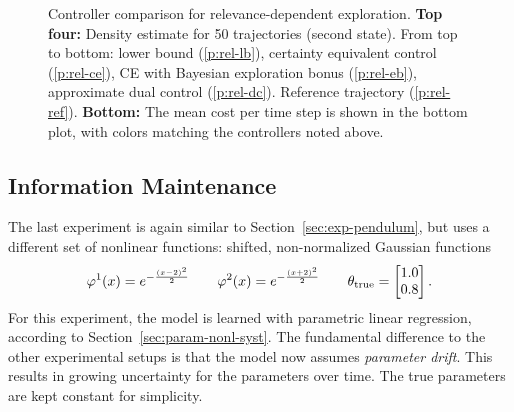 \begin{figure*}
  \setlength\figureheight{8cm}
  \setlength{}
  \footnotesize
  \caption[Controller comparison for relevance-dependent
exploration.]{Controller comparison for relevance-dependent exploration.
{\bfseries Top four:} Density estimate for 50 trajectories (second
state). From top to bottom: lower bound (\ref*{p:rel-lb}), certainty equivalent
control (\ref*{p:rel-ce}), CE with Bayesian exploration bonus (\ref*{p:rel-eb}),
approximate dual control (\ref*{p:rel-dc}). Reference trajectory
(\ref*{p:rel-ref}). {\bfseries Bottom:} The mean cost per time step is shown in
the bottom plot, with colors matching the controllers noted above.
  }\label{fig:position-relevance}
\end{figure*}

\subsection{Information Maintenance}
\label{sec:exp-knowledge-maintenance}
The last experiment is again similar to Section~\ref{sec:exp-pendulum}, but uses
a different set of nonlinear functions: shifted, non-normalized Gaussian
functions
\begin{equation}
  \varphi^1(x) = e^{-\frac{(x-2)^2}{2}}
  \qquad
  \varphi^2(x) = e^{-\frac{(x+2)^2}{2}}
  \qquad
  \theta_\text{true} = \begin{bmatrix} 1.0 \\ 0.8 \end{bmatrix}.
\end{equation}
For this experiment, the model is learned with parametric linear regression,
according to Section~\ref{sec:param-nonl-syst}. The fundamental difference to
the other experimental setups is that the model now assumes \emph{parameter
drift}. This results in growing uncertainty for the parameters over time. The
true parameters are kept constant for simplicity.

